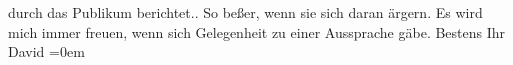 \begin{ledgroupsized}[t]{13cm}
{{{                  durch das Publikum berichtet.}}}\label{K_L00902_1h}. So beßer, wenn sie sich daran ärgern.\pend
           \pstart
           Es wird mich immer freuen, wenn sich Gelegenheit zu einer Aussprache gäbe.\pend
           \pstart
           Bestens Ihr{\\[\baselineskip]}\spacefill\mbox{David}\pend
           \leftskip=0em{}          \endnumbering{}\end{ledgroupsized}  \newcommand{\dateiname}{L00902}\newcommand{\titel}{Jakob Julius David an Arthur Schnitzler, [8. 3. 1899?]}\newcommand{\editorInnen}{Martin Anton Müller und Gerd-Hermann Susen}
            \footnotesize
\begin{ledgroupsized}[t]{11.5cm}
\end{ledgroupsized}
         
      